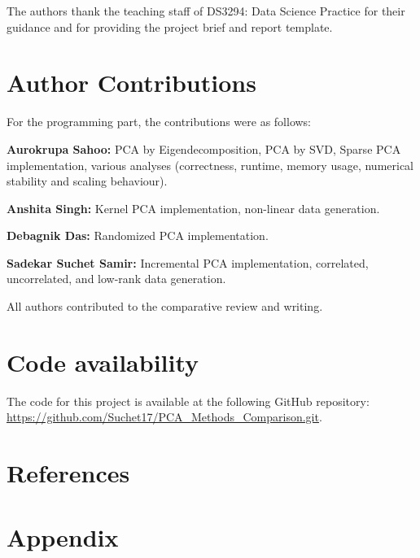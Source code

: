 The authors thank the teaching staff of DS3294: Data Science Practice for
their guidance and for providing the project brief and report template.

\section{Author Contributions}
For the programming part, the contributions were as follows: 
\smallksip 

\textbf{Aurokrupa Sahoo:} PCA by Eigendecomposition, PCA by SVD, Sparse PCA implementation, various analyses (correctness, runtime, memory usage, numerical stability and scaling behaviour). 
\smallskip

\textbf{Anshita Singh:} Kernel PCA implementation, non-linear data generation.
\smallskip 

\textbf{Debagnik Das:} Randomized PCA implementation.
\smallskip

\textbf{Sadekar Suchet Samir:} Incremental PCA implementation, correlated, uncorrelated, and low-rank data generation.
\smallskip 

All authors contributed to the comparative review and writing.

\section{Code availability}

The code for this project is available at the following GitHub repository:
\url{https://github.com/Suchet17/PCA_Methods_Comparison.git}.

\section{References}


\section{Appendix}

